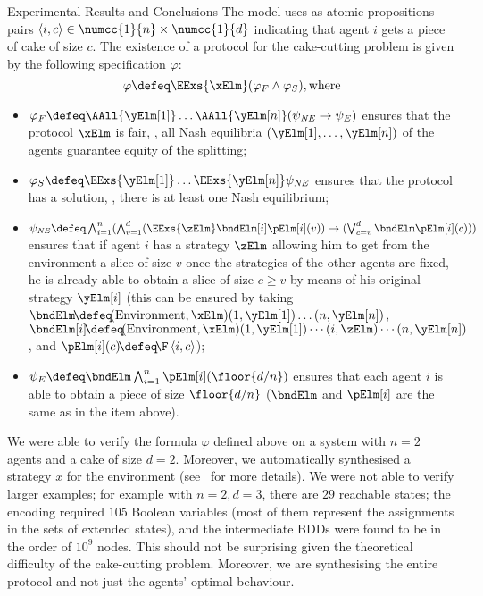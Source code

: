 \begin{section}{Experimental Results and Conclusions}
The model uses as atomic propositions pairs
$\left\langle i, c \right\rangle \in \numcc{1}{n} \times \numcc{1}{d}$
indicating that agent $i$ gets a piece of cake of size $c$.
The existence of a protocol for the cake-cutting problem is given by the
following \SL specification $\varphi$:
\[
\varphi \defeq \EExs{\xElm} (\varphi_{F} \wedge \varphi_{S}), \text{where}
\]
\begin{itemize}
\item
$\varphi_{F} \defeq \AAll{\yElm[1]} \ldots \AAll{\yElm[n]} (\psi_{\mathit{NE}}
\rightarrow \psi_{E})$ ensures that the protocol $\xElm$ is fair, \ie, all Nash
equilibria $(\yElm[1], \ldots, \yElm[n])$ of the agents guarantee equity of
the splitting;
\item
$\varphi_{S} \defeq \EExs{\yElm[1]} \ldots \EExs{\yElm[n]} \psi_{\mathit{NE}}$
ensures
that the protocol has a solution, \ie, there is at least one Nash equilibrium;
\item
$\psi_{\mathit{NE}} \defeq \bigwedge_{i = 1}^{n} (\bigwedge_{v = 1}^{d}
(\EExs{\zElm}
\bndElm[i] \pElm[i](v)) \rightarrow (\bigvee_{c = v}^{d} \bndElm \pElm[i](c)))$
ensures that if agent $i$ has a strategy $\zElm$ allowing him to get from the
environment a slice of size $v$ once the strategies of the other agents are
fixed, he is already able to obtain a slice of size $c \geq v$ by means of his
original strategy $\yElm[i]$ (this can be ensured by taking $\bndElm \!\defeq\!
(\mathrm{Environment}, \xElm) (1, \yElm[1]) \ldots (n, \yElm[n])$, $\bndElm[i]
\!\defeq\! (\mathrm{Environment}, \xElm) (1, \yElm[1]) \cdots (i, \zElm) \cdots
\allowbreak (n, \yElm[n])$, and $\pElm[i](c) \!\defeq\! \F
\left\langle i, c \right\rangle$);
\item
$\psi_{E} \defeq \bndElm \bigwedge_{i = 1}^{n} \pElm[i](\floor{d / n})$ ensures
that each agent $i$ is able to obtain a piece of size $\floor{d / n}$ ($\bndElm$
and $\pElm[i]$ are the same as in the item above).
\end{itemize}
We were able to verify the formula $\varphi$ defined above on a system with $n =
2$ agents and a cake of size $d = 2$.
Moreover, we automatically synthesised a strategy $x$ for the environment
(see~\cite{MCMASSLK} for more details).
We were not able to verify larger examples; for example with $n=2, d=3$, there
are $29$ reachable states; the encoding required $105$ Boolean variables (most
of them represent the assignments in the sets of extended states), and the
intermediate BDDs were found to be in the order of $10^9$ nodes.
This should not be surprising given the theoretical difficulty of the
cake-cutting problem.
Moreover, we are synthesising the entire protocol and not just the agents'
optimal behaviour.




\end{section}
